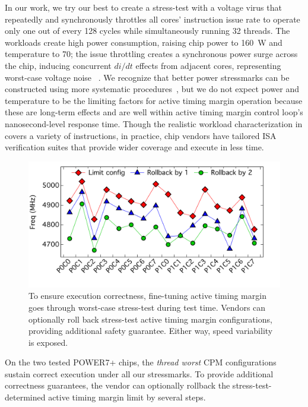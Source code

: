 In our work, we try our best to create a stress-test with a voltage virus that repeatedly and synchronously throttles all cores' instruction issue rate to operate only one out of every 128 cycles while simultaneously running 32 {} threads. The {} workloads create high power consumption, raising chip power to 160~W and temperature to 70\C; the issue throttling creates a synchronous power surge across the chip, inducing concurrent $di/dt$ effects from adjacent cores, representing worst-case voltage noise ~\cite{lefurgy2011active,vezyrtzis2018droop}. We recognize that better power stressmarks can be constructed using more systematic procedures~\cite{bertran2012systematic}, but we do not expect power and temperature to be the limiting factors for active timing margin operation because these are long-term effects and are well within active timing margin control loop's nanosecond-level response time. Though the realistic workload characterization in  covers a variety of instructions, in practice, chip vendors have tailored ISA verification suites that provide wider coverage and execute in less time.

\begin{figure}[t]
  \centering
  \includegraphics[trim=0 50 0 0,clip,width=.85\linewidth]{graphs/process/freq-variation.pdf}
  \caption{To ensure execution correctness, fine-tuning active timing margin goes through worst-case stress-test during test time. Vendors can optionally roll back stress-test active timing margin configurations, providing additional safety guarantee. Either way, speed variability is exposed.}
  \label{fig:freq-var}
\end{figure}

On the two tested POWER7+ chips, the \textit{thread worst} CPM configurations sustain correct execution under all our stressmarks. To provide additional correctness guarantees, the vendor can optionally rollback the stress-test-determined active timing margin limit by several steps.

